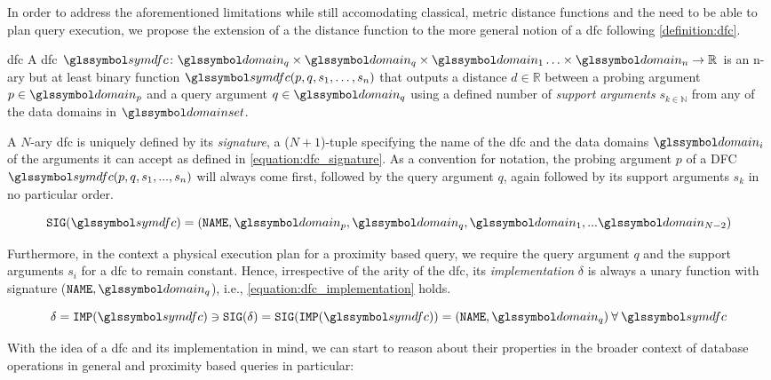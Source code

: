 In order to address the aforementioned limitations while still accomodating classical, metric distance functions and the need to be able to plan query execution, we propose the extension of a the distance function to the more general notion of a \acrfull{dfc} following \cref{definition:dfc}.

\begin{definition}[label=definition:dfc]{\acrlong{dfc}}{}
    A \acrshort{dfc} $\symdfc \colon \domain_q \times \domain_q \times \domain_{1} \ldots \times \domain_{n} \to \mathbb{R}$ is an n-ary but at least binary function $\symdfc(p,q,s_1,\ldots,s_n)$ that outputs a distance $d \in \mathbb{R}$ between a probing argument $p \in \domain_p$ and a query argument $q \in \domain_q$ using a defined number of \emph{support arguments} $s_{k \in \mathbb{N}}$ from any of the data domains in $\domainset$.
\end{definition}

A $N$-ary \acrshort{dfc}  is uniquely defined by its \emph{signature}, a ($N+1$)-tuple specifying the name of the \acrshort{dfc} and the data domains $\domain_i$ of the arguments it can accept as defined in \cref{equation:dfc_signature}.   As a convention for notation, the probing argument $p$ of a DFC $\symdfc(p,q,s_1,...,s_n)$ will always come first, followed by the query argument $q$, again followed by its support arguments $s_k$ in no particular order.

\begin{equation}
    \label{equation:dfc_signature}
    \texttt{SIG}(\symdfc) = (\mathtt{NAME}, \domain_p, \domain_q, \domain_1,... \domain_{N-2})
\end{equation}

Furthermore, in the context a physical execution plan for a proximity based query, we require the query argument $q$ and the support arguments $s_i$ for a \acrshort{dfc} to remain constant. Hence, irrespective of the arity of the \acrshort{dfc}, its \emph{implementation} $\delta$ is always a unary function with signature ($\mathtt{NAME}, \domain_q$), i.e., \cref{equation:dfc_implementation} holds.

\begin{equation}
    \label{equation:dfc_implementation}
    \delta = \texttt{IMP}(\symdfc) \ni \texttt{SIG}(\delta) = \texttt{SIG}(\texttt{IMP}(\symdfc)) = (\mathtt{NAME}, \domain_q) \: \forall \: \symdfc
\end{equation}

With the idea of a \acrshort{dfc} and its implementation in mind, we can start to reason about their properties in the broader context of database operations in general and proximity based queries in particular:

